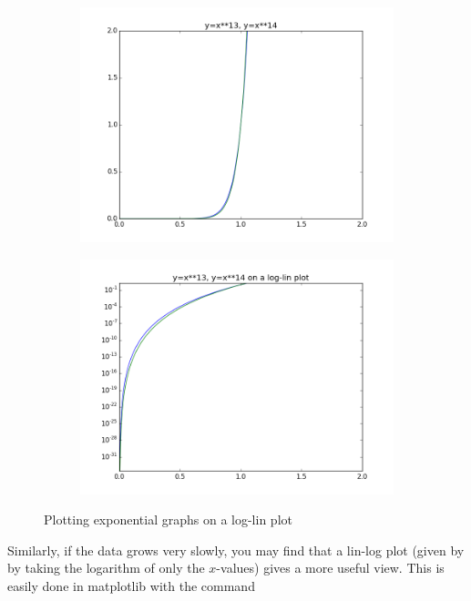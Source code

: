 \begin{figure}[h]
\centering
\begin{subfigure}{.45\textwidth}
\centering
\includegraphics[width=\textwidth]{exponential.png}
\end{subfigure}
\begin{subfigure}{.45\textwidth}
\centering
\includegraphics[width=\textwidth]{exponential_loglin}
\end{subfigure}
\caption{Plotting exponential graphs on a log-lin plot}
\label{fig:exp}
\end{figure}


Similarly, if the data grows very slowly, you may find that a lin-log plot (given by by taking the logarithm of only the $x$-values) gives a more useful view.
This is easily done in matplotlib with the command 


